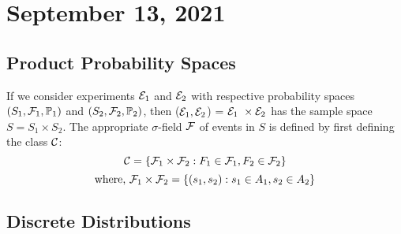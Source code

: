 \section{September 13, 2021}
\subsection{Product Probability Spaces}
If we consider experiments $\mathcal E_1$ and $\mathcal E_2$ with respective probability spaces $(S_1,\mathcal F_1, \mathbb P_1)$ and $(S_2,\mathcal F_2, \mathbb P_2)$, then ($\mathcal E_1, \mathcal E_2$) = $\mathcal E_1\ \times \mathcal E_2$ has the sample space $S = S_1 \times S_2$. The appropriate $\sigma$-field $\mathcal F$ of events in $S$ is defined by first defining the class $\mathcal C$:
$$
\mathcal C = \{ \mathcal F_1 \times \mathcal F_2: F_1 \in \mathcal F_1, F_2 \in \mathcal F_2 \}
$$
$$
\text{where, } \mathcal F_1 \times \mathcal F_2 = \{ (s_1,s_2): s_1 \in A_1, s_2 \in A_2 \}
$$
\subsection{Discrete Distributions}

